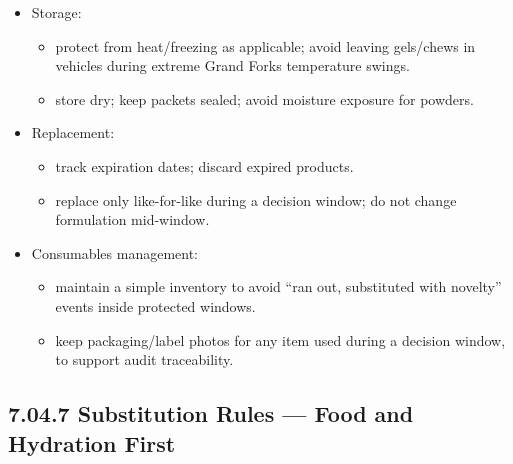 \documentclass[10pt]{article}
\begin{document}
\begin{itemize}
\item Storage:
  \begin{itemize}
  \item protect from heat/freezing as applicable; avoid leaving gels/chews in vehicles during extreme Grand Forks temperature swings.
  \item store dry; keep packets sealed; avoid moisture exposure for powders.
  \end{itemize}
\item Replacement:
  \begin{itemize}
  \item track expiration dates; discard expired products.
  \item replace only like-for-like during a decision window; do not change formulation mid-window.
  \end{itemize}
\item Consumables management:
  \begin{itemize}
  \item maintain a simple inventory to avoid “ran out, substituted with novelty” events inside protected windows.
  \item keep packaging/label photos for any item used during a decision window, to support audit traceability.
  \end{itemize}
\end{itemize}

\subsection*{7.04.7 Substitution Rules — Food and Hydration First}
{}
\end{document}
